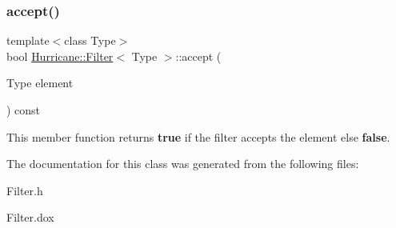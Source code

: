 \subsubsection{\texorpdfstring{accept()}{accept()}}
{\footnotesize\ttfamily template$<$class Type$>$ \\
bool \mbox{\hyperlink{classHurricane_1_1Filter}{Hurricane\+::\+Filter}}$<$ Type $>$\+::accept (\begin{DoxyParamCaption}\item[{Type}]{element }\end{DoxyParamCaption}) const\hspace{0.3cm}{\ttfamily [pure virtual]}}

This member function returns {\bfseries true} if the filter accepts the element else {\bfseries false}. 

The documentation for this class was generated from the following files\+:\begin{DoxyCompactItemize}
\item 
Filter.\+h\item 
Filter.\+dox\end{DoxyCompactItemize}
